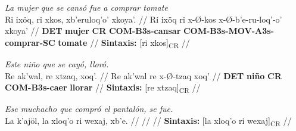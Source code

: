 \documentclass{article}%
\begin{document}
%
\par\medskip%
\ex
\textit{La mujer que se cansó fue a comprar tomate} \\
\begingl
\gla Ri ixöq, ri xkos, xb'eruloq'o' xkoya'. //
\glb Ri ixöq ri x-Ø-kos x-Ø-b'e-ru-loq'-o' xkoya' //
\glc \textbf{DET} \textbf{mujer} \textbf{CR} \textbf{COM-}\textbf{B3s-}\textbf{cansar} \textbf{COM-}\textbf{B3s-}\textbf{MOV-}\textbf{A3s-}\textbf{comprar-}\textbf{SC} \textbf{tomate} //
\glft \textbf{Sintaxis:} [ri xkos]\textsubscript{CR} //
\endgl
\xe
%
\medskip%
\par\medskip%
\ex
\textit{Este niño que se cayó, lloró.} \\
\begingl
\gla Re ak'wal, re xtzaq, xoq'. //
\glb Re ak'wal re x-Ø-tzaq xoq' //
\glc \textbf{DET} \textbf{niño} \textbf{CR} \textbf{COM-}\textbf{B3s-}\textbf{caer} \textbf{llorar} //
\glft \textbf{Sintaxis:} [re xtzaq]\textsubscript{CR} //
\endgl
\xe
%
\medskip%
\par\medskip%
\ex
\textit{Ese muchacho que compró el pantalón, se fue.} \\
\begingl
\gla La k'ajöl, la xloq'o ri wexaj, xb'e. //
\glb  //
\glc  //
\glft \textbf{Sintaxis:} [la xloq'o ri wexaj]\textsubscript{CR} //
\endgl
\xe
%
\medskip

%
\end{document}
